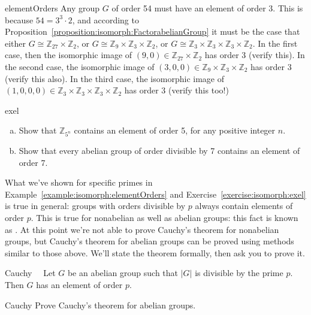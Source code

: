 \begin{example}{elementOrders}  Any group $G$ of order 54 must have an element of order 3. This is because $54 =  3^3 \cdot 2$, and according to     
Proposition~\ref{proposition:isomorph:FactorabelianGroup} it must be the case that either $G \cong {\mathbb Z}_{27} \times {\mathbb Z}_2$, or  $G \cong {\mathbb Z}_9 \times {\mathbb Z}_3 \times {\mathbb Z}_2$, or 
$G \cong {\mathbb Z}_{3} \times {\mathbb Z}_{3} \times {\mathbb Z}_{3} \times {\mathbb Z}_2$.  In the first case, then the isomorphic image of $(9,0) \in {\mathbb Z}_{27} \times {\mathbb Z}_2$ has order 3 (verify this).  In the second case, the isomorphic image of $(3,0,0) \in {\mathbb Z}_{9} \times {\mathbb Z}_3 \times {\mathbb Z}_2$ has order 3 (verify this also). In the third case, the isomorphic image of $(1,0,0,0) \in {\mathbb Z}_{3} \times {\mathbb Z}_3 \times {\mathbb Z}_3 \times {\mathbb Z}_2$ has order 3 (verify this too!) 
\end{example}

\begin{exercise}{exel}
\begin{enumerate}[(a)]
\item
Show that $\mathbb{Z}_{5^n}$ contains an element of order 5, for any positive integer $n$.
\item
Show that every abelian group of order divisible by 7 contains an element of order 7.  
\end{enumerate}
\end{exercise}

What we've shown for specific primes in Example~\ref{example:isomorph:elementOrders} and Exercise~\ref{exercise:isomorph:exel} is  true in general: groups with orders divisible by $p$ always contain elements of order $p$. This is true for nonabelian as well as abelian groups:  this fact is known as .  At this point we're not able to prove Cauchy's theorem for nonabelian groups, but Cauchy's theorem for abelian groups can be proved using methods similar to those above.  We'll state the theorem formally, then ask you to prove it.

\begin{prop}{Cauchy} ~~Let $G$ be an abelian  group such that $|G|$ is divisible by the prime $p$. Then $G$ has an element of order $p$.  
\end{prop}

\begin{exercise}{Cauchy}
Prove Cauchy's theorem for abelian groups.
\end{exercise}


